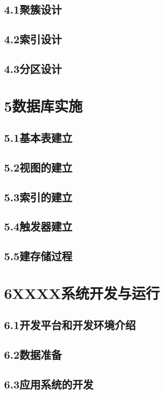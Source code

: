 \documentclass{zjut-report}
\begin{document}
\section{4.1\quad 聚簇设计}
\section{4.2\quad 索引设计}
\section{4.3\quad 分区设计}

\chapter{5\quad 数据库实施}
\section{5.1\quad 基本表建立}
\section{5.2\quad 视图的建立}
\section{5.3\quad 索引的建立}
\section{5.4\quad 触发器建立}
\section{5.5\quad 建存储过程}

\chapter{6\quad XXXX系统开发与运行}
\section{6.1\quad 开发平台和开发环境介绍}
\section{6.2\quad 数据准备}
\section{6.3\quad 应用系统的开发}
\end{document}
